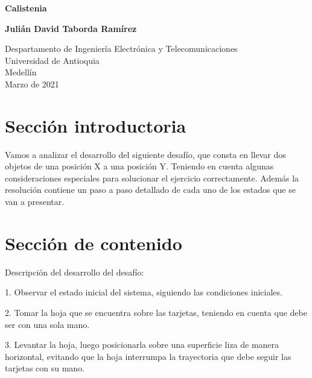 \documentclass{article}
\begin{document}
\begin{titlepage}
    \begin{center}
        \vspace*{1cm}
            
        \Huge
        \textbf{Calistenia}
            
        \vspace{0.5cm}
        \LARGE
            
        \vspace{1.5cm}
            
        \textbf{Julián David Taborda Ramírez}
            
        \vfill
            
        \vspace{0.8cm}
            
        \Large
        Despartamento de Ingeniería Electrónica y Telecomunicaciones\\
        Universidad de Antioquia\\
        Medellín\\
        Marzo de 2021 
            
    \end{center}
\end{titlepage}

\tableofcontents
\newpage
\section{Sección introductoria}\label{intro}
Vamos a analizar el desarrollo del siguiente desafío, que consta en llevar dos objetos de una posición X a una posición Y. Teniendo en cuenta algunas consideraciones especiales para solucionar el ejercicio correctamente. Además la resolución contiene un paso a paso detallado de cada uno de los estados que se van a presentar.
\section{Sección de contenido} \label{contenido}
Descripción del desarrollo del desafío:

1. Observar el estado inicial del sistema, siguiendo las condiciones iniciales.

2. Tomar la hoja que se encuentra sobre las tarjetas, teniendo en cuenta que debe ser con una sola mano. 

3. Levantar la hoja, luego posicionarla sobre una superficie liza de manera horizontal, evitando que la hoja interrumpa la trayectoria que debe seguir las tarjetas con su mano. 
\end{document}
